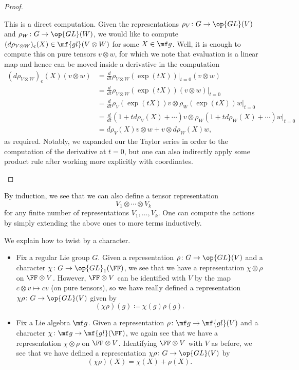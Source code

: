 \documentclass[../notes.tex]{subfiles}
\begin{document}
\begin{proof}
\begin{listalph}
		\item This is a direct computation. Given the representations $\rho_V\colon G\to\op{GL}(V)$ and $\rho_W\colon G\to\op{GL}(W)$, we would like to compute $(d\rho_{V\otimes W})_e(X)\in\mf{gl}(V\otimes W)$ for some $X\in\mf g$. Well, it is enough to compute this on pure tensors $v\otimes w$, for which we note that evaluation is a linear map and hence can be moved inside a derivative in the computation
		\begin{align*}
			(d\rho_{V\otimes W})_e(X)(v\otimes w) &= \frac d{dt}\rho_{V\otimes W}(\exp(tX))\bigg|_{t=0}(v\otimes w) \\
			&= \frac d{dt}\rho_{V\otimes W}(\exp(tX))(v\otimes w)\bigg|_{t=0} \\
			&= \frac d{dt}\rho_V(\exp(tX))v\otimes\rho_W(\exp(tX))w\bigg|_{t=0} \\
			&= \frac d{dt}(1+td\rho_V(X)+\cdots)v\otimes\rho_W(1+td\rho_W(X)+\cdots)w\bigg|_{t=0} \\
			&= d\rho_V(X)v\otimes w+v\otimes d\rho_W(X)w,
		\end{align*}
		as required. Notably, we expanded our the Taylor series in order to the computation of the derivative at $t=0$, but one can also indirectly apply some product rule after working more explicitly with coordinates.
		\qedhere
	\end{listalph}
\end{proof}
\begin{remark}
	By induction, we see that we can also define a tensor representation
	\[V_1\otimes\cdots\otimes V_k\]
	for any finite number of representations $V_1,\ldots,V_k$. One can compute the actions by simply extending the above ones to more terms inductively.
\end{remark}
\begin{example} \label{ex:twist-by-character}
	We explain how to twist by a character.
	\begin{itemize}
		\item Fix a regular Lie group $G$. Given a representation $\rho\colon G\to\op{GL}(V)$ and a character $\chi\colon G\to\op{GL}_1(\FF)$, we see that we have a representation $\chi\otimes\rho$ on $\FF\otimes V$. However, $\FF\otimes V$ can be identified with $V$ by the map $c\otimes v\mapsto cv$ (on pure tensors), so we have really defined a representation $\chi\rho\colon G\to\op{GL}(V)$ given by
		\[(\chi\rho)(g)\coloneqq\chi(g)\rho(g).\]
		\item Fix a Lie algebra $\mf g$. Given a representation $\rho\colon\mf g\to\mf{gl}(V)$ and a character $\chi\colon\mf g\to\mf{gl}(\FF)$, we again see that we have a representation $\chi\otimes\rho$ on $\FF\otimes V$. Identifying $\FF\otimes V$ with $V$ as before, we see that we have defined a representation $\chi\rho\colon G\to\op{GL}(V)$ by
		\[(\chi\rho)(X)=\chi(X)+\rho(X).\]
	\end{itemize}
\end{example}
\end{document}
